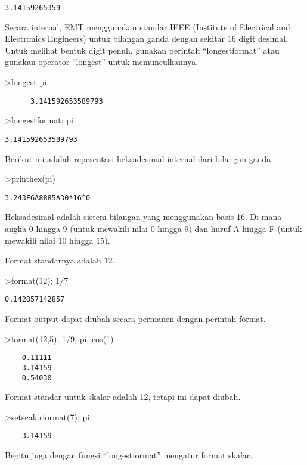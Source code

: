 \documentclass[
]{book}
\begin{document}
\begin{verbatim}
3.14159265359
\end{verbatim}

Secara internal, EMT menggunakan standar IEEE (Institute of Electrical and Electronics Engineers) untuk bilangan ganda dengan sekitar 16 digit desimal. Untuk melihat bentuk digit penuh, gunakan perintah ``longestformat'' atau gunakan operator ``longest'' untuk memunculkannya.

\textgreater longest pi

\begin{verbatim}
      3.141592653589793 
\end{verbatim}

\textgreater longestformat; pi

\begin{verbatim}
3.141592653589793
\end{verbatim}

Berikut ini adalah repesentasi heksadesimal internal dari bilangan ganda.

\textgreater printhex(pi)

\begin{verbatim}
3.243F6A8885A30*16^0
\end{verbatim}

Heksadesimal adalah sistem bilangan yang menggunakan basis 16. Di mana angka 0 hingga 9 (untuk mewakili nilai 0 hingga 9) dan huruf A hingga F (untuk mewakili nilai 10 hingga 15).

Format standarnya adalah 12.

\textgreater format(12); 1/7

\begin{verbatim}
0.142857142857
\end{verbatim}

Format output dapat diubah secara permanen dengan perintah format.

\textgreater format(12,5); 1/9, pi, cos(1)

\begin{verbatim}
    0.11111 
    3.14159 
    0.54030 
\end{verbatim}

Format standar untuk skalar adalah 12, tetapi ini dapat diubah.

\textgreater setscalarformat(7); pi

\begin{verbatim}
    3.14159 
\end{verbatim}

Begitu juga dengan fungsi ``longestformat'' mengatur format skalar.
\end{document}
